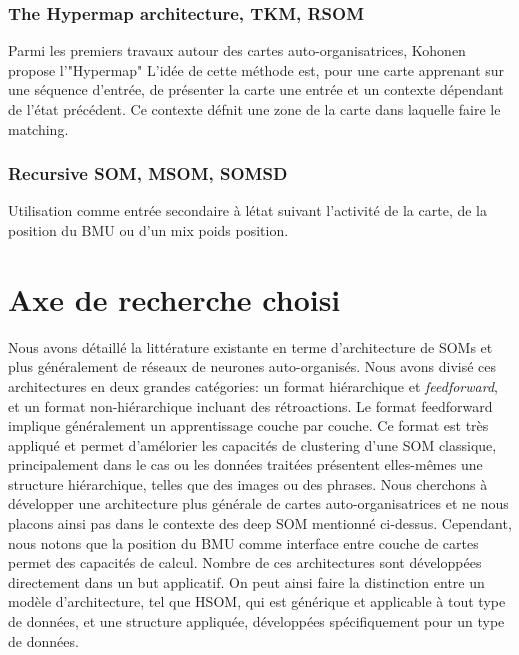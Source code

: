 \documentclass[../main]{subfiles}
\begin{document}
\subsubsection{The Hypermap architecture, TKM, RSOM}
Parmi les premiers travaux autour des cartes auto-organisatrices, Kohonen propose l'"Hypermap" \cite{Kohonen1991THEHA} L'idée de cette méthode est, pour une carte apprenant sur une séquence d'entrée, de présenter la carte une entrée et un contexte dépendant de l'état précédent. Ce contexte défnit une zone de la carte dans laquelle faire le matching.
\cite{varsta_temporal_2001}
\subsubsection{Recursive SOM, MSOM, SOMSD}
\cite{Voegtlin2002RecursiveSM,hammer_recursive_2004,hammer_self-organizing_2005,hagenbuchner_self-organizing_2003,fix20}
Utilisation comme entrée secondaire à létat suivant l'activité de la carte, de la position du BMU ou d'un mix poids position. 


\section{Axe de recherche choisi}

Nous avons détaillé la littérature existante en terme d'architecture de SOMs et plus généralement de réseaux de neurones auto-organisés. Nous avons divisé ces architectures en deux grandes catégories: un format hiérarchique et \emph{feedforward}, et un format non-hiérarchique incluant des rétroactions.
Le format feedforward implique généralement un apprentissage couche par couche. Ce format est très appliqué et permet d'amélorier les capacités de clustering d'une SOM classique, principalement dans le cas ou les données traitées présentent elles-mêmes une structure hiérarchique, telles que des images ou des phrases.
Nous cherchons à développer une architecture plus générale de cartes auto-organisatrices et ne nous placons ainsi pas dans le contexte des deep SOM mentionné ci-dessus. 
Cependant, nous notons que la position du BMU comme interface entre couche de cartes permet des capacités de calcul.
Nombre de ces architectures sont développées directement dans un but applicatif. On peut ainsi faire la distinction entre un modèle d'architecture, tel que HSOM, qui est générique et applicable à tout type de données, et une structure appliquée, développées spécifiquement pour un type de données.
\end{document}

